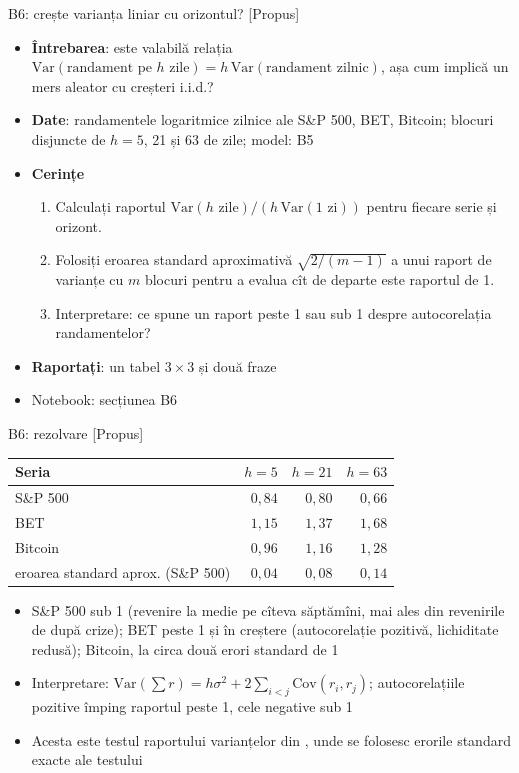 \begin{frame}{B6: crește varianța liniar cu orizontul? [Propus]}
\itemsize{\footnotesize}
\begin{itemize}
\item \textbf{Întrebarea}: este valabilă relația $\text{Var}(\text{randament pe } h \text{ zile}) = h\,\text{Var}(\text{randament zilnic})$, așa cum implică un mers aleator cu creșteri i.i.d.?
\item \textbf{Date}: randamentele logaritmice zilnice ale S\&P 500, BET, Bitcoin; blocuri disjuncte de $h = 5$, 21 și 63 de zile; model: B5
\item \textbf{Cerințe}
\begin{enumerate}
    \item Calculați raportul $\text{Var}(h \text{ zile})/(h\,\text{Var}(1 \text{ zi}))$ pentru fiecare serie și orizont.
    \item Folosiți eroarea standard aproximativă $\sqrt{2/(m - 1)}$ a unui raport de varianțe cu $m$ blocuri pentru a evalua cît de departe este raportul de 1.
    \item Interpretare: ce spune un raport peste 1 sau sub 1 despre autocorelația randamentelor?
\end{enumerate}
\item \textbf{Raportați}: un tabel $3 \times 3$ și două fraze
\item Notebook: secțiunea B6
\end{itemize}
\end{frame}

\ifsolutions
\begin{frame}{B6: rezolvare [Propus]}
\itemsize{\footnotesize}
\begin{center}
\footnotesize
\begin{tabular}{lrrr}
\toprule
Seria & $h = 5$ & $h = 21$ & $h = 63$ \\
\midrule
S\&P 500 & $0{,}84$ & $0{,}80$ & $0{,}66$ \\
BET & $1{,}15$ & $1{,}37$ & $1{,}68$ \\
Bitcoin & $0{,}96$ & $1{,}16$ & $1{,}28$ \\
eroarea standard aprox. (S\&P 500) & $0{,}04$ & $0{,}08$ & $0{,}14$ \\
\bottomrule
\end{tabular}
\end{center}
\begin{itemize}
    \item S\&P 500 sub 1 (revenire la medie pe cîteva săptămîni, mai ales din revenirile de după crize); BET peste 1 și în creștere (autocorelație pozitivă, lichiditate redusă); Bitcoin, la circa două erori standard de 1
    \item Interpretare: $\text{Var}(\sum r) = h\sigma^2 + 2\sum_{i<j}\text{Cov}(r_i, r_j)$; autocorelațiile pozitive împing raportul peste 1, cele negative sub 1
    \item Acesta este testul raportului varianțelor din , unde se folosesc erorile standard exacte ale testului
\end{itemize}
\end{frame}
\fi



